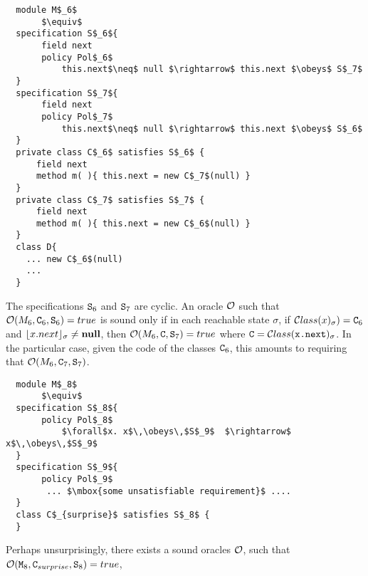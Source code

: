  \begin{lstlisting}
  module M$_6$
       $\equiv$
  specification S$_6${
       field next
       policy Pol$_6$
           this.next$\neq$ null $\rightarrow$ this.next $\obeys$ S$_7$
  }
  specification S$_7${
       field next
       policy Pol$_7$
           this.next$\neq$ null $\rightarrow$ this.next $\obeys$ S$_6$
  }
  private class C$_6$ satisfies S$_6$ {
      field next
      method m( ){ this.next = new C$_7$(null) }
  }
  private class C$_7$ satisfies S$_7$ {
      field next
      method m( ){ this.next = new C$_6$(null) }
  }
  class D{
    ... new C$_6$(null)
    ...
  }
\end{lstlisting}

The specifications ${\textrm{\ttfamily{S}}}{_6}$ and  ${\textrm{\ttfamily{S}}}{_7}$ are  cyclic.
An oracle ${\cal O}$  such that ${\cal O}(M_6, {\textrm{\ttfamily{C}}}_6,{\textrm{\ttfamily{S}}}_6)=true$ is sound only if
  in each reachable state $\sigma$, if ${\cal C}lass (x)_\sigma)={\textrm{\ttfamily{C}}}_6$ and
${\lfloor{ {x.next}}\rfloor_{\sigma}}\neq {{\bf { null}}}$, then
${\cal O}(M_6, {\textrm{\ttfamily{C}}},{\textrm{\ttfamily{S}}}_7)=true$ where
${\textrm{\ttfamily{C}}}={\cal C}lass ({\textrm{\ttfamily{x.next}}})_\sigma$.
 In the particular case, given the code of the classes ${\textrm{\ttfamily{C}}}_6$, this
amounts to requiring that ${\cal O}(M_6, {\textrm{\ttfamily{C}}}_7,{\textrm{\ttfamily{S}}}_7)$.


 \begin{lstlisting}
  module M$_8$
       $\equiv$
  specification S$_8${
       policy Pol$_8$
           $\forall$x. x$\,\obeys\,$S$_9$  $\rightarrow$ x$\,\obeys\,$S$_9$
  }
  specification S$_9${
       policy Pol$_9$
        ... $\mbox{some unsatisfiable requirement}$ ....
  }
  class C$_{surprise}$ satisfies S$_8$ {
  }
\end{lstlisting}

Perhaps unsurprisingly, there exists a sound oracles ${\cal O}$, such that
\ \  ${\cal O}({\textrm{\ttfamily{M}}}_8,{\textrm{\ttfamily{C}}}_{surprise},{\textrm{\ttfamily{S}}}_8)=true$,








